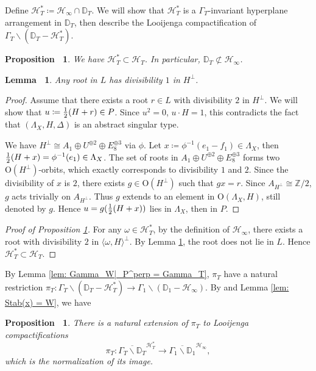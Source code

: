 \documentclass[12pt,reqno,a4paper]{amsart}
\newtheorem{lem}[thm]{Lemma~}
\newtheorem{prop}[thm]{Proposition~}
\theoremstyle{remark}
\theoremstyle{definition}
\newcommand{\ZZ}{\mathbb{Z}}
\newcommand{\DD}{\mathbb{D}}
\newcommand{\calH}{\mathcal{H}}
\newcommand\Or{\mathrm{O}}
\newcommand{\bs}{\backslash}
\begin{document}
Define $\calH_T^*\coloneqq\calH_\infty\cap\DD_T$.
We will show that $\calH_T^*$ is a $\Gamma_T$-invariant hyperplane arrangement in $\DD_T$, then describe the Looijenga compactification of $\Gamma_T\bs(\DD_T-\calH_T^*)$.
\begin{prop}
\label{prop: calH_* subset calH_T}
    We have $\calH_T^*\subset\calH_T$.
    In particular, $\DD_T\not\subset\calH_\infty$.
\end{prop}
\begin{lem}
\label{lem: div(root in L)=1}
    Any root in $L$ has divisibility $1$ in $H^\perp$.
\end{lem}
\begin{proof}
    Assume that there exists a root $r\in L$ with divisibility $2$ in $H^\perp$.
    We will show that $u\coloneqq {1\over2}(H+r)\in P$.
    Since $u^2=0$, $u\cdot H=1$, this contradicts the fact that $(\Lambda_X,H,\Delta)$ is an abstract singular type.

    We have $H^\perp\cong A_1\oplus U^{\oplus 2}\oplus E_8^{\oplus 3}$ via $\phi$.
    Let $x\coloneqq\phi^{-1}(e_1-f_1)\in\Lambda_X$, then ${1\over2}(H+x)=\phi^{-1}(e_1)\in\Lambda_X$.
    The set of roots in $A_1\oplus U^{\oplus 2}\oplus E_8^{\oplus 3}$ forms two $\Or(H^\perp)$-orbits, which exactly corresponds to divisibility $1$ and $2$.
    Since the divisibility of $x$ is $2$, there exists $g\in\Or(H^\perp)$ such that $g x=r$.
    Since $A_{H^\perp}\cong \ZZ/2$, $g$ acts trivially on $A_{H^\perp}$.
    Thus $g$ extends to an element in $\Or(\Lambda_X,H)$, still denoted by $g$.
    Hence $u=g({1\over2}(H+x))$ lies in $\Lambda_X$, then in $P$.
\end{proof}
\begin{proof}[Proof of Proposition \ref{prop: calH_* subset calH_T}]
    For any $\omega\in\calH_T^*$, by the definition of $\calH_\infty$, there exists a root with divisibility $2$ in $\langle \omega,H \rangle^\perp$.
    By Lemma \ref{lem: div(root in L)=1}, the root does not lie in $L$.
    Hence $\calH_T^*\subset\calH_T$.
\end{proof}

By Lemma \ref{lem: Gamma_W|_P^perp = Gamma_T}, $\pi_T$ have a natural restriction $\pi_T\colon\Gamma_T\bs(\DD_T-\calH_T^*)\to\Gamma_1\bs(\DD_1-\calH_\infty)$.
By \cite[Theorem A.13]{yu2020fourfolds} and Lemma \ref{lem: Stab(x) = W}, we have 
\begin{prop}
\label{prop: Loo comp: type T to total}
    There is a natural extension of $\pi_T$ to Looijenga compactifications
    \begin{equation*}
        \pi_T\colon \overline{\Gamma_T\bs\DD_T}^{\calH_T^*}\to \overline{\Gamma_1\bs\DD_1}^{\calH_\infty},
    \end{equation*}
    which is the normalization of its image.
\end{prop}
\end{document}

